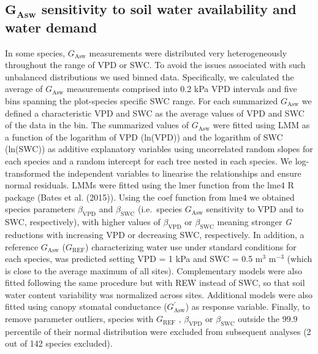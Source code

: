 \documentclass[11pt,twoside]{reedthesis}
\begin{document}
\subsection{\texorpdfstring{\(\textbf{G}_{\textbf{Asw}}\) sensitivity to
soil water availability and water
demand}{\textbackslash{}textbf\{G\}\_\{\textbackslash{}textbf\{Asw\}\} sensitivity to soil water availability and water demand}}\label{textbfg_textbfasw-sensitivity-to-soil-water-availability-and-water-demand}

In some species, \(G_{\text{Asw}}\) measurements were distributed very
heterogeneously throughout the range of VPD or SWC. To avoid the issues
associated with such unbalanced distributions we used binned data.
Specifically, we calculated the average of \(G_{\text{Asw}}\)
measurements comprised into 0.2 kPa VPD intervals and five bins spanning
the plot-species specific SWC range. For each summarized
\(G_{\text{Asw}}\) we defined a characteristic VPD and SWC as the
average values of VPD and SWC of the data in the bin. The summarized
values of \(G_{\text{Asw}}\) were fitted using LMM as a function of the
logarithm of VPD (ln(VPD)) and the logarithm of SWC (ln(SWC)) as
additive explanatory variables using uncorrelated random slopes for each
species and a random intercept for each tree nested in each species. We
log-transformed the independent variables to linearise the relationships
and ensure normal residuals. LMMs were fitted using the lmer function
from the lme4 R package (Bates et al. (2015)). Using the coef function
from lme4 we obtained species parameters \(\beta_{\text{VPD}}\) and
\(\beta_{\text{SWC}}\) (i.e.~species \(G_{\text{Asw}}\) sensitivity to
VPD and to SWC, respectively), with higher values of
\(\beta_{\text{VPD}}\) or \(\beta_{\text{SWC}}\) meaning stronger
\emph{G} reductions with increasing VPD or decreasing SWC, respectively.
In addition, a reference \(G_{\text{Asw}}\) (\(G_{\text{REF}}\))
characterizing water use under standard conditions for each species, was
predicted setting VPD = 1 kPa and SWC = 0.5 \(\text{m}^3\)
\(\text{m}^{-3}\) (which is close to the average maximum of all sites).
Complementary models were also fitted following the same procedure but
with REW instead of SWC, so that soil water content variability was
normalized across sites. Additional models were also fitted using canopy
stomatal conductance (\(G_{\text{Asw}}^{'}\)) as response variable.
Finally, to remove parameter outliers, species with \(G_{\text{REF}}\) ,
\(\beta_{\text{VPD}}\) or \(\beta_{\text{SWC}}\) outside the 99.9
percentile of their normal distribution were excluded from subsequent
analyses (2 out of 142 species excluded).\par
\end{document}
